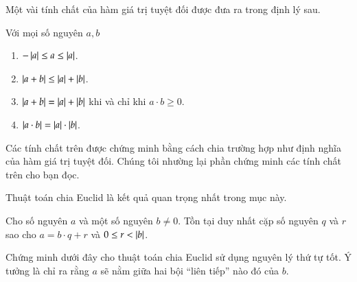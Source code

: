 Một vài tính chất của hàm giá trị tuyệt đối được đưa ra trong định lý sau.
\begin{theorem}
	Với mọi số nguyên $a, b$
	\begin{enumerate}[label={(\roman*)}]
		\item $-\left\vert{a}\right\vert\leq a \leq \left\vert{a}\right\vert$.
		\item $\left\vert{a + b}\right\vert\leq \left\vert{a}\right\vert + \left\vert{b}\right\vert$.
		\item $\left\vert{a + b}\right\vert = \left\vert{a}\right\vert + \left\vert{b}\right\vert$ khi và chỉ khi $a\cdot b\geq 0$.
		\item $\left\vert{a\cdot b}\right\vert = \left\vert{a}\right\vert\cdot\left\vert{b}\right\vert$.
	\end{enumerate}
\end{theorem}

Các tính chất trên được chứng minh bằng cách chia trường hợp như định nghĩa của hàm giá trị tuyệt đối. Chúng tôi nhường lại phần chứng minh các tính chất trên cho bạn đọc.

Thuật toán chia Euclid là kết quả quan trọng nhất trong mục này.
\begin{theorem}
	Cho số nguyên $a$ và một số nguyên $b\ne 0$. Tồn tại duy nhất cặp số nguyên $q$ và $r$ sao cho $a = b\cdot q + r$ và $0\leq r < \left\vert{b}\right\vert$.
\end{theorem}

Chứng minh dưới đây cho thuật toán chia Euclid sử dụng nguyên lý thứ tự tốt. Ý tưởng là chỉ ra rằng $a$ sẽ nằm giữa hai bội ``liên tiếp'' nào đó của $b$.

